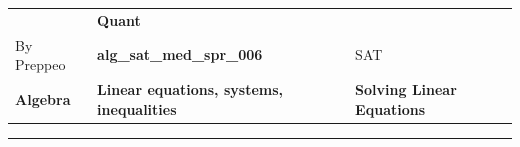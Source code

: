 \documentclass[11pt,paper=a4,answers]{exam}
\begin{document}
\begin{center}
    \centering
    \renewcommand{\arraystretch}{1.5}
    \begin{tabularx}{\textwidth}{YYY}
    & \normalsize\bf{{\Large{{Quant}}}} & \\
    By Preppeo & \normalsize\bf{{alg\_sat\_med\_spr\_006}} & SAT\\
    \normalsize{{\textbf{{Algebra}} }} & \normalsize{{\textbf{{Linear equations, systems, inequalities }} }} & \normalsize{{\textbf{{Solving Linear Equations}} }} \\
    \end{tabularx}
\end{center}
\par\noindent\rule{\textwidth}{1pt}
\end{document}
